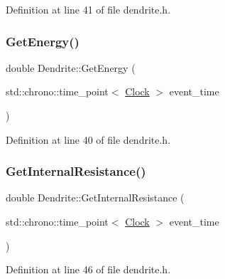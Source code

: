 Definition at line 41 of file dendrite.\+h.

\mbox{\label{class_dendrite_a1aa1fd51aab3996cf1a9b0ff6a86647c}} 
\subsubsection{\texorpdfstring{Get\+Energy()}{GetEnergy()}}
{\footnotesize\ttfamily double Dendrite\+::\+Get\+Energy (\begin{DoxyParamCaption}\item[{std\+::chrono\+::time\+\_\+point$<$ \mbox{\hyperlink{universe_8h_a0ef8d951d1ca5ab3cfaf7ab4c7a6fd80}{Clock}} $>$}]{event\+\_\+time }\end{DoxyParamCaption})\hspace{0.3cm}{\ttfamily [inline]}}



Definition at line 40 of file dendrite.\+h.

\mbox{\label{class_dendrite_a7dd00ac5440edf9943389951a275b9bc}} 
\subsubsection{\texorpdfstring{Get\+Internal\+Resistance()}{GetInternalResistance()}}
{\footnotesize\ttfamily double Dendrite\+::\+Get\+Internal\+Resistance (\begin{DoxyParamCaption}\item[{std\+::chrono\+::time\+\_\+point$<$ \mbox{\hyperlink{universe_8h_a0ef8d951d1ca5ab3cfaf7ab4c7a6fd80}{Clock}} $>$}]{event\+\_\+time }\end{DoxyParamCaption})\hspace{0.3cm}{\ttfamily [inline]}}



Definition at line 46 of file dendrite.\+h.

\mbox{\label{class_dendrite_a3551fe5fcf9c7ec767a6171f61a5ba51}} 
